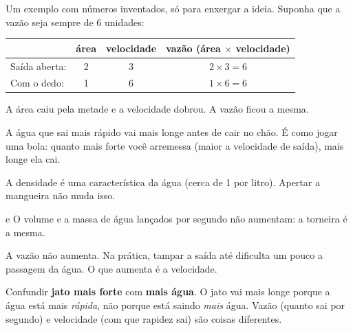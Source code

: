 Um exemplo com números inventados, só para enxergar a ideia. Suponha que a vazão seja sempre de 6 unidades:
\begin{conta}
\renewcommand{\arraystretch}{1.25}
\begin{tabular}{lccc}
 & \textbf{área} & \textbf{velocidade} & \textbf{vazão (área $\times$ velocidade)}\\ \hline
Saída aberta: & 2 & 3 & $2 \times 3 = 6$\\
Com o dedo: & 1 & 6 & $1 \times 6 = 6$
\end{tabular}
\end{conta}
A área caiu pela metade e a velocidade dobrou. A vazão ficou a mesma.

A água que sai mais rápido vai mais longe antes de cair no chão. É como jogar uma bola: quanto mais forte você arremessa
(maior a velocidade de saída), mais longe ela cai.


\begin{outras}
 A densidade é uma característica da água (cerca de 1 por litro). Apertar a mangueira não muda isso.\par
{} e  O volume e a massa de água lançados por segundo não aumentam: a torneira é a mesma.\par
{} A vazão não aumenta. Na prática, tampar a saída até dificulta um pouco a passagem da água. O que aumenta é a velocidade.
\end{outras}

\begin{pegadinha}
Confundir \textbf{jato mais forte} com \textbf{mais água}. O jato vai mais longe porque a água está mais \emph{rápida},
não porque está saindo \emph{mais} água. Vazão (quanto sai por segundo) e velocidade (com que rapidez sai) são coisas diferentes.
\end{pegadinha}
